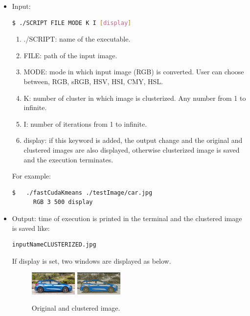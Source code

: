 \documentclass[10pt,twocolumn,letterpaper]{article}
\begin{document}
\begin{itemize}
    \item Input: \begin{lstlisting}[language=bash]
  $ ./SCRIPT FILE MODE K I [display]
 \end{lstlisting}
    \begin{enumerate}
        \item ./SCRIPT: name of the executable.
        \item FILE: path of the input image.
        \item MODE: mode in which input image (RGB) is converted. User can choose between, RGB, sRGB, HSV, HSI, CMY, HSL.
        \item K: number of cluster in which image is clusterized. Any number from 1 to infinite.
        \item I: number of iterations from 1 to infinite.
        \item display: if this keyword is added, the output change and  the original and clustered images are also displayed, otherwise clusterized image is saved and the execution terminates.
    \end{enumerate}
    
    For example:
    \begin{lstlisting}[language=bash]
  $   ./fastCudaKmeans ./testImage/car.jpg
      RGB 3 500 display
 \end{lstlisting}
  
    \item Output: time of execution is printed in the terminal and the clustered image is saved like:     \begin{lstlisting}[language=bash]
    inputNameCLUSTERIZED.jpg 
 \end{lstlisting}
 If display is set, two windows are displayed as below.
    \begin{figure}[H]
\includegraphics[width=0.22\textwidth]{latex/orig.png}
\hfill
\includegraphics[width=0.22\textwidth]{latex/clust3.png}
\caption{Original and clustered image.}
\label{etichetta}
\end{figure}
\end{itemize}
\end{document}
